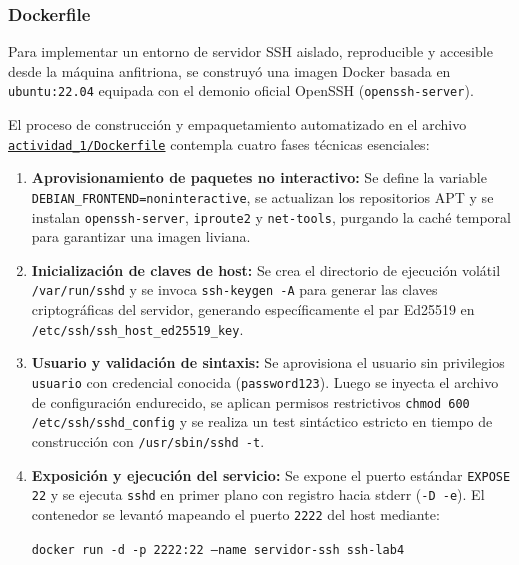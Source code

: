 \documentclass[letter,12pt]{article}
\begin{document}
\subsubsection{Dockerfile}

Para implementar un entorno de servidor SSH aislado, reproducible y accesible desde la máquina anfitriona, se construyó una imagen Docker basada en \texttt{ubuntu:22.04} equipada con el demonio oficial OpenSSH (\texttt{openssh-server}).

El proceso de construcción y empaquetamiento automatizado en el archivo \href{https://github.com/minicoast/lab4-criptografia-udp/blob/main/actividad_1/Dockerfile}{\texttt{actividad\_1/Dockerfile}} contempla cuatro fases técnicas esenciales:

\begin{enumerate}
    \item \textbf{Aprovisionamiento de paquetes no interactivo:} Se define la variable \texttt{DEBIAN\_FRONTEND=noninteractive}, se actualizan los repositorios APT y se instalan \texttt{openssh-server}, \texttt{iproute2} y \texttt{net-tools}, purgando la caché temporal para garantizar una imagen liviana.
    \item \textbf{Inicialización de claves de host:} Se crea el directorio de ejecución volátil \texttt{/var/run/sshd} y se invoca \texttt{ssh-keygen -A} para generar las claves criptográficas del servidor, generando específicamente el par Ed25519 en \texttt{/etc/ssh/ssh\_host\_ed25519\_key}.
    \item \textbf{Usuario y validación de sintaxis:} Se aprovisiona el usuario sin privilegios \texttt{usuario} con credencial conocida (\texttt{password123}). Luego se inyecta el archivo de configuración endurecido, se aplican permisos restrictivos \texttt{chmod 600 /etc/ssh/sshd\_config} y se realiza un test sintáctico estricto en tiempo de construcción con \texttt{/usr/sbin/sshd -t}.
    \item \textbf{Exposición y ejecución del servicio:} Se expone el puerto estándar \texttt{EXPOSE 22} y se ejecuta \texttt{sshd} en primer plano con registro hacia stderr (\texttt{-D -e}). El contenedor se levantó mapeando el puerto \texttt{2222} del host mediante:
    \begin{center}
        \texttt{docker run -d -p 2222:22 --name servidor-ssh ssh-lab4}
    \end{center}
\end{enumerate}
\end{document}
